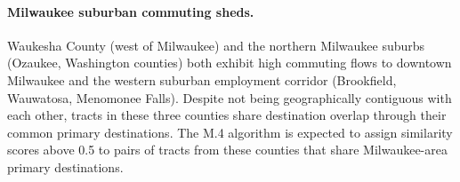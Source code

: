 \paragraph{Milwaukee suburban commuting sheds.}
Waukesha County (west of Milwaukee) and the northern Milwaukee suburbs
(Ozaukee, Washington counties) both exhibit high commuting flows to
downtown Milwaukee and the western suburban employment corridor (Brookfield,
Wauwatosa, Menomonee Falls).
Despite not being geographically contiguous with each other, tracts in these
three counties share destination overlap through their common primary
destinations.
The M.4 algorithm is expected to assign similarity scores above 0.5 to
pairs of tracts from these counties that share Milwaukee-area primary
destinations.
